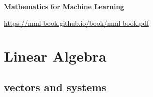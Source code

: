 \documentclass[12pt, letterpaper]{article}
\begin{document}
\vspace{-1cm}
\begin{center}
  {\Huge\bfseries Mathematics for Machine Learning}
\end{center}

\begin{center}
  \url{https://mml-book.github.io/book/mml-book.pdf}
\end{center}

\section{Linear Algebra}

\subsection{vectors and systems}
\end{document}
